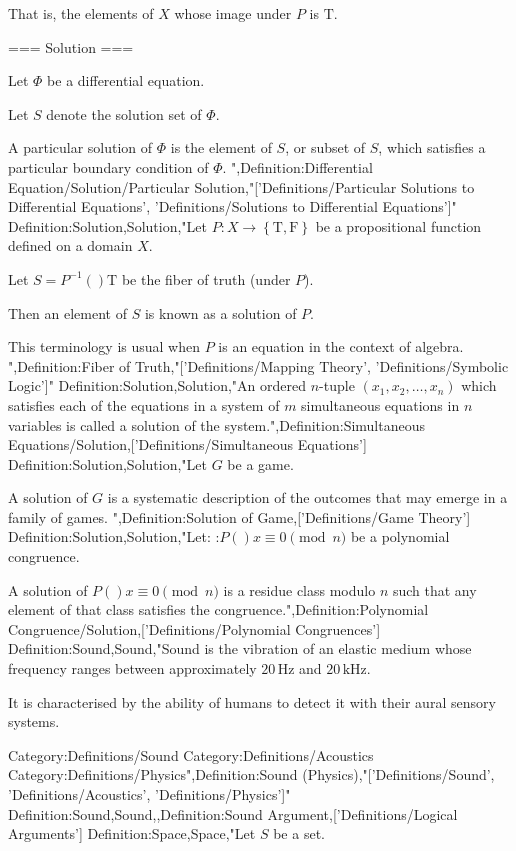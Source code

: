 That is, the elements of $X$ whose image under $P$ is $\mathrm T$.


=== Solution ===

Let $\Phi$ be a differential equation.

Let $S$ denote the solution set of $\Phi$.

A particular solution of $\Phi$ is the element of $S$, or subset of $S$, which satisfies a particular boundary condition of $\Phi$.
",Definition:Differential Equation/Solution/Particular Solution,"['Definitions/Particular Solutions to Differential Equations', 'Definitions/Solutions to Differential Equations']"
Definition:Solution,Solution,"Let $P: X \to \left\lbrace \mathrm T, \mathrm F \right\rbrace$ be a propositional function defined on a domain $X$.

Let $S = P^{-1}  \left(   \right)\mathrm T$ be the fiber of truth (under $P$).


Then an element of $S$ is known as a solution of $P$.


This terminology is usual when $P$ is an equation in the context of algebra.
",Definition:Fiber of Truth,"['Definitions/Mapping Theory', 'Definitions/Symbolic Logic']"
Definition:Solution,Solution,"An ordered $n$-tuple $\left( x_1, x_2, \ldots, x_n \right)$ which satisfies each of the equations in a system of $m$ simultaneous equations in $n$ variables is called a solution of the system.",Definition:Simultaneous Equations/Solution,['Definitions/Simultaneous Equations']
Definition:Solution,Solution,"Let $G$ be a game.

A solution of $G$ is a systematic description of the outcomes that may emerge in a family of games.
",Definition:Solution of Game,['Definitions/Game Theory']
Definition:Solution,Solution,"Let:
:$P \left(   \right)x \equiv 0 \pmod n$
be a polynomial congruence.


A solution of $P \left(   \right)x \equiv 0 \pmod n$ is a residue class modulo $n$ such that any element of that class satisfies the congruence.",Definition:Polynomial Congruence/Solution,['Definitions/Polynomial Congruences']
Definition:Sound,Sound,"Sound is the vibration of an elastic medium whose frequency ranges between approximately $20 \, \text {Hz}$ and $20 \, \text {kHz}$.

It is characterised by the ability of humans to detect it with their aural sensory systems.


Category:Definitions/Sound
Category:Definitions/Acoustics
Category:Definitions/Physics",Definition:Sound (Physics),"['Definitions/Sound', 'Definitions/Acoustics', 'Definitions/Physics']"
Definition:Sound,Sound,,Definition:Sound Argument,['Definitions/Logical Arguments']
Definition:Space,Space,"Let $S$ be a set.

